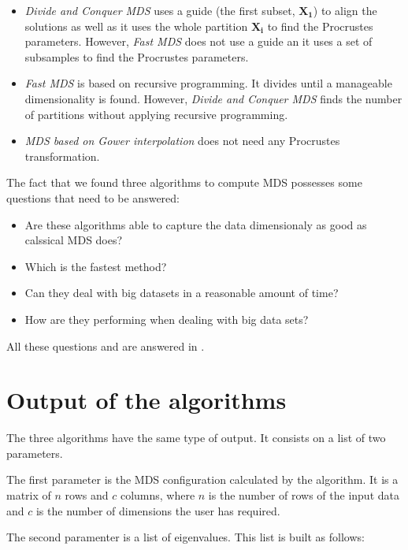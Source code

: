 \documentclass[11pt]{report}
\begin{document}
\begin{itemize}
\item \textit{Divide and Conquer MDS} uses a guide 
(the first subset, $\mathbf{X_1}$) to align the solutions as well as it uses the whole partition $\mathbf{X_i}$ to find the Procrustes parameters. However, 
\textit{Fast MDS} does not use a guide an it uses a set of subsamples to 
find the Procrustes parameters.

\item \textit{Fast MDS} is based on recursive programming. It divides until 
a manageable dimensionality is found. However, \textit{Divide and Conquer MDS} 
finds the number of partitions without applying recursive programming.

\item \textit{MDS based on Gower interpolation} does not need any Procrustes
transformation. 

\end{itemize}

The fact that we found three algorithms to compute MDS possesses some questions 
that need to be answered:

\begin{itemize}
\item Are these algorithms able to capture the data dimensionaly as good as 
calssical MDS does?
\item Which is the fastest method?
\item Can they deal with big datasets in a reasonable amount of time?
\item How are they performing when dealing with big data sets?
\end{itemize}

All these questions and are answered in .

\section{Output of the algorithms}
The three algorithms have the same type of output. It consists on a list of 
two parameters. 

\indent The first parameter is the MDS configuration calculated by the 
algorithm. It is a matrix of $n$ rows and $c$ columns, where $n$ is the number 
of rows of the input data and $c$ is the number of dimensions the user has 
required.

\indent The second paramenter is a list of eigenvalues. This list is built
as follows: 
\end{document}

